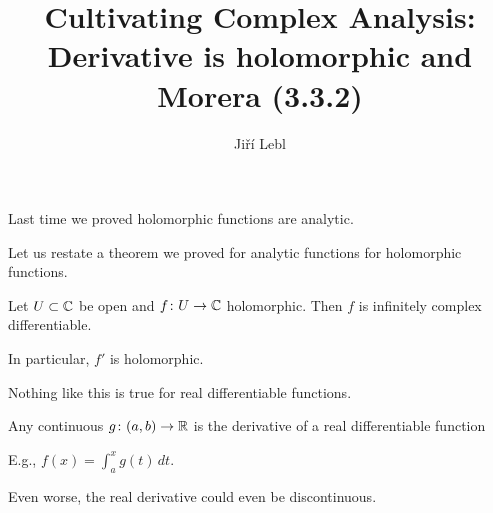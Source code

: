 \documentclass[10pt,aspectratio=169]{beamer}
\author{Ji\v{r}\'i Lebl}
\institute[OSU]{%
Departemento pri Matematiko de Oklahoma {\^S}tata Universitato}
\title{Cultivating Complex Analysis:\\%
Derivative is holomorphic and Morera (3.3.2)}
\date{}
\begin{document}
\begin{frame}
\titlepage
\end{frame}

\begin{frame}
Last time we proved holomorphic functions are analytic.

\medskip
\pause

Let us restate a theorem we proved
for analytic functions for holomorphic functions.

\pause

\begin{theorem}
Let $U \subset {\mathbb{C}}$ be open and $f \colon U \to {\mathbb{C}}$ holomorphic.  Then
$f$ is infinitely complex differentiable.

\pause
In particular, $f'$ is holomorphic.
\end{theorem}

\pause

Nothing like this is true for real differentiable functions.

\medskip
\pause

Any continuous $g \colon (a,b) \to {\mathbb{R}}$ is the derivative of a real differentiable function

E.g., $f(x) = \int_a^x g(t)\,dt$.

\medskip
\pause

Even worse, the real derivative could even be discontinuous.

\end{frame}
\end{document}
